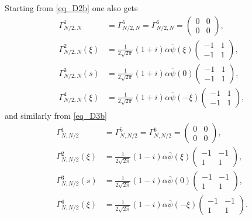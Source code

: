\documentclass[11pt]{article}
\begin{document}
Starting from \eqref{eq_D2b} one also gets 
\begin{align*}
\Gamma^1_{N/2,N} & = \Gamma^5_{N/2,N} = \Gamma^6_{N/2,N}= \left(\begin{smallmatrix} 0 & 0 \\ 0 & 0 \end{smallmatrix}\right), \\
\Gamma^2_{N/2,N}(\xi) &
= \frac{1}{2\sqrt{2\pi}}(1+i)\alpha \overline{\psi}(\xi) \left(\begin{smallmatrix} -1 & 1 \\ -1 & 1 \end{smallmatrix}\right), \\
\Gamma^3_{N/2,N}(s) & 
= \frac{1}{2\sqrt{2\pi}}(1+i)\alpha \overline{\psi}(0) \left(\begin{smallmatrix} -1 & 1 \\ -1 & 1 \end{smallmatrix}\right), \\
\Gamma^4_{N/2,N}(\xi) &
= \frac{1}{2\sqrt{2\pi}}(1+i)\alpha \overline{\psi}(-\xi) \left(\begin{smallmatrix} -1 & 1 \\ -1 & 1 \end{smallmatrix}\right), 
\end{align*}
and similarly from \eqref{eq_D3b}
\begin{align*}
\Gamma^1_{N,N/2} & = \Gamma^5_{N,N/2} = \Gamma^6_{N,N/2} = \left(\begin{smallmatrix} 0 & 0 \\ 0 & 0 \end{smallmatrix}\right), \\
\Gamma^2_{N,N/2}(\xi) & 
= \frac{1}{2\sqrt{2\pi}}(1-i)\alpha \overline{\psi}(\xi) \left(\begin{smallmatrix} -1 & -1 \\ 1 & 1 \end{smallmatrix}\right), \\
\Gamma^3_{N,N/2}(s) & 
= \frac{1}{2\sqrt{2\pi}}(1-i)\alpha \overline{\psi}(0) \left(\begin{smallmatrix} -1 & -1 \\ 1 & 1 \end{smallmatrix}\right),  \\
\Gamma^4_{N,N/2}(\xi) & 
= \frac{1}{2\sqrt{2\pi}}(1-i)\alpha \overline{\psi}(-\xi) \left(\begin{smallmatrix} -1 & -1 \\ 1 & 1 \end{smallmatrix}\right).
\end{align*}
\end{document}

